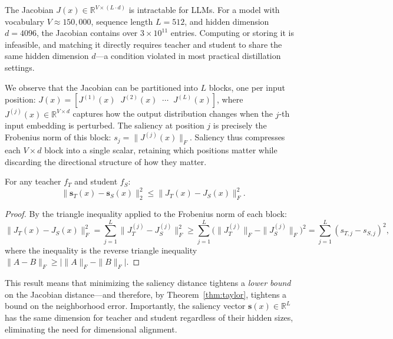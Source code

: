 The Jacobian $J(x) \in \mathbb{R}^{V \times (L \cdot d)}$ is intractable for LLMs. For a model with vocabulary $V \approx 150{,}000$, sequence length $L = 512$, and hidden dimension $d = 4096$, the Jacobian contains over $3 \times 10^{11}$ entries. Computing or storing it is infeasible, and matching it directly requires teacher and student to share the same hidden dimension $d$---a condition violated in most practical distillation settings.

We observe that the Jacobian can be partitioned into $L$ blocks, one per input position:
$J(x) = [J^{(1)}(x) \;\; J^{(2)}(x) \;\; \cdots \;\; J^{(L)}(x)]$,
where $J^{(j)}(x) \in \mathbb{R}^{V \times d}$ captures how the output distribution changes when the $j$-th input embedding is perturbed. The saliency at position $j$ is precisely the Frobenius norm of this block: $s_j = \|J^{(j)}(x)\|_F$.
Saliency thus compresses each $V \times d$ block into a single scalar, retaining which positions matter while discarding the directional structure of how they matter.

\begin{theorem}\label{thm:saliency-bound}
For any teacher $f_T$ and student $f_S$:
\begin{equation}\label{eq:saliency-bound}
\|\mathbf{s}_T(x) - \mathbf{s}_S(x)\|_2^2 \leq \|J_T(x) - J_S(x)\|_F^2.
\end{equation}
\end{theorem}

\begin{proof}
By the triangle inequality applied to the Frobenius norm of each block:
\begin{equation}
\|J_T(x) - J_S(x)\|_F^2 = \sum_{j=1}^L \|J_T^{(j)} - J_S^{(j)}\|_F^2 \geq \sum_{j=1}^L \bigl(\|J_T^{(j)}\|_F - \|J_S^{(j)}\|_F\bigr)^2 = \sum_{j=1}^L (s_{T,j} - s_{S,j})^2,
\end{equation}
where the inequality is the reverse triangle inequality $\|A - B\|_F \geq \bigl|\|A\|_F - \|B\|_F\bigr|$.
\end{proof}

This result means that minimizing the saliency distance tightens a \emph{lower bound} on the Jacobian distance---and therefore, by Theorem~\ref{thm:taylor}, tightens a bound on the neighborhood error. Importantly, the saliency vector $\mathbf{s}(x) \in \mathbb{R}^L$ has the same dimension for teacher and student regardless of their hidden sizes, eliminating the need for dimensional alignment.


